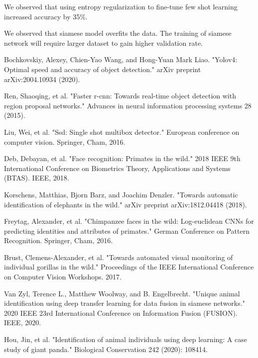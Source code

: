\documentclass[10pt,twocolumn,letterpaper]{article}
\begin{document}
We observed that using entropy regularization to fine-tune few shot learning increased accuracy by 35\%.

We observed that siamese model overfits the data. The training of siamese network will require larger dataset to gain higher validation rate. 





\begin{thebibliography}{99}

	Bochkovskiy, Alexey, Chien-Yao Wang, and Hong-Yuan Mark Liao. "Yolov4: Optimal speed and accuracy of object detection." arXiv preprint arXiv:2004.10934 (2020).
	
	Ren, Shaoqing, et al. "Faster r-cnn: Towards real-time object detection with region proposal networks." Advances in neural information processing systems 28 (2015).
	

	Liu, Wei, et al. "Ssd: Single shot multibox detector." European conference on computer vision. Springer, Cham, 2016.


	Deb, Debayan, et al. "Face recognition: Primates in the wild." 2018 IEEE 9th International Conference on Biometrics Theory, Applications and Systems (BTAS). IEEE, 2018. 


	Korschens, Matthias, Bjorn Barz, and Joachim Denzler. "Towards automatic identification of elephants in the wild." arXiv preprint arXiv:1812.04418 (2018). 


	Freytag, Alexander, et al. "Chimpanzee faces in the wild: Log-euclidean CNNs for predicting identities and attributes of primates." German Conference on Pattern Recognition. Springer, Cham, 2016. 


	Brust, Clemens-Alexander, et al. "Towards automated visual monitoring of individual gorillas in the wild." Proceedings of the IEEE International Conference on Computer Vision Workshops. 2017. 


	Van Zyl, Terence L., Matthew Woolway, and B. Engelbrecht. "Unique animal identification using deep transfer learning for data fusion in siamese networks." 2020 IEEE 23rd International Conference on Information Fusion (FUSION). IEEE, 2020. 


	Hou, Jin, et al. "Identification of animal individuals using deep learning: A case study of giant panda." Biological Conservation 242 (2020): 108414. 



\end{thebibliography}
\end{document}
